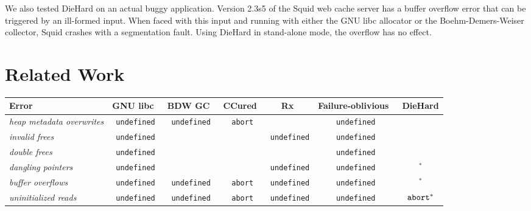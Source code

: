 \documentclass{sig-alternate}
\begin{document}
\noindent
We also tested DieHard on an actual buggy application. Version 2.3s5
of the Squid web cache server has a buffer overflow error that can be
triggered by an ill-formed input. When faced with this input and
running with either the GNU libc allocator or the Boehm-Demers-Weiser
collector, Squid crashes with a segmentation fault. Using DieHard in
stand-alone mode, the overflow has no effect.



\section{Related Work}
\label{sec:related}

\begin{table*}[t]
\centering
\begin{tabular}{|l|ccccc|c|}
\hline
{\bf Error}		& {\bf GNU libc~\cite{lea97}}	& { \bf BDW GC~\cite{boeh88}} & { \bf CCured~\cite{503286}} & { \bf Rx~\cite{rx}} & {\bf Failure-oblivious~\cite{failure-oblivious}} & {\bf DieHard} \\ \hline
{\it heap metadata overwrites} 	& {\tt undefined}		& {\tt undefined}	& {\tt abort} 	& \checkmark & {\tt undefined} & {\bf \checkmark}	\\ 
{\it invalid frees} 	& {\tt undefined}		& \checkmark	& \checkmark  	& {\tt undefined} & {\tt undefined} & {\bf \checkmark}	\\ 
{\it double frees} 	& {\tt undefined}		& \checkmark	& \checkmark  	& \checkmark & {\tt undefined} & {\bf \checkmark}	\\
{\it dangling pointers} & {\tt undefined}		& \checkmark	& \checkmark  	& {\tt undefined} & {\tt undefined}  & {\bf \checkmark}$^{*}$	\\
{\it buffer overflows}  & {\tt undefined}		& {\tt undefined}	& {\tt abort}		& {\tt undefined} & {\tt undefined} & {\bf \checkmark}$^{*}$	 \\ %
{\it uninitialized reads} & {\tt undefined}		& {\tt undefined}	& {\tt abort}		& {\tt undefined} & {\tt undefined} & {\bf $\mbox{\tt abort}^{*}$}  \\ \hline
\end{tabular}
\caption{This table compares how various systems handle memory safety errors: \checkmark denotes correct execution, {\tt undefined} denotes an undefined result, and {\tt abort} means the program terminates abnormally. See Section~\ref{sec:related} for a detailed explanation of each system. The DieHard results for the last three errors (marked with asterisks) are probabilistic; see Section~\ref{sec:analysis} for exact formulae.\label{tbl:error-responses}}
\end{table*}
\end{document}

